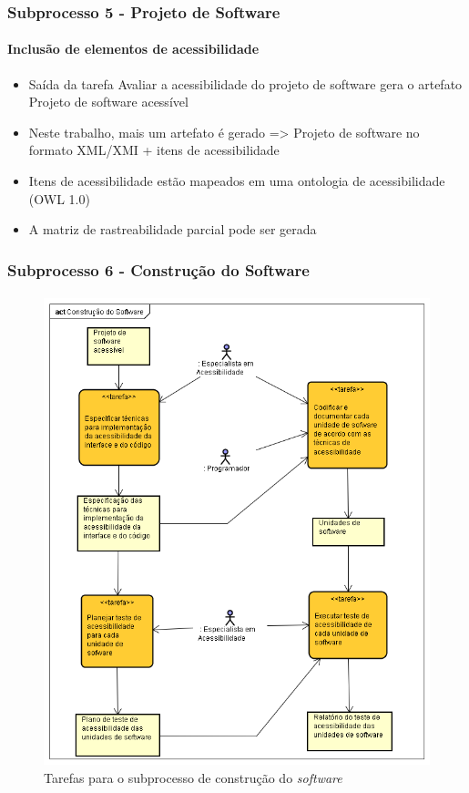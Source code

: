 \documentclass{beamer}
\begin{document}
\begin{frame}
\frametitle{Subprocesso 5 - Projeto de Software}
\framesubtitle{Inclusão de elementos de acessibilidade}

\begin{itemize}
  \item Saída da tarefa Avaliar a acessibilidade do projeto de software gera o artefato Projeto de software acessível
  \item Neste trabalho, mais um artefato é gerado => Projeto de software no formato XML/XMI + itens de acessibilidade
  \item Itens de acessibilidade estão mapeados em uma ontologia de acessibilidade \citep{aegis:13} (OWL 1.0)
  \item A matriz de rastreabilidade parcial pode ser gerada
\end{itemize}

\end{frame}

\begin{frame}
\frametitle{Subprocesso 6 - Construção do Software}
\framesubtitle{}

\begin{figure}[htbp] \centering
	\includegraphics[width=\textwidth,height=.65\textheight,keepaspectratio]{./img/subprocesso6.png}
	\caption{Tarefas para o subprocesso de construção do \textit{software} \citep{maia:10}}
	\label{fig:sub6}
\end{figure}

\end{frame}
\end{document}
